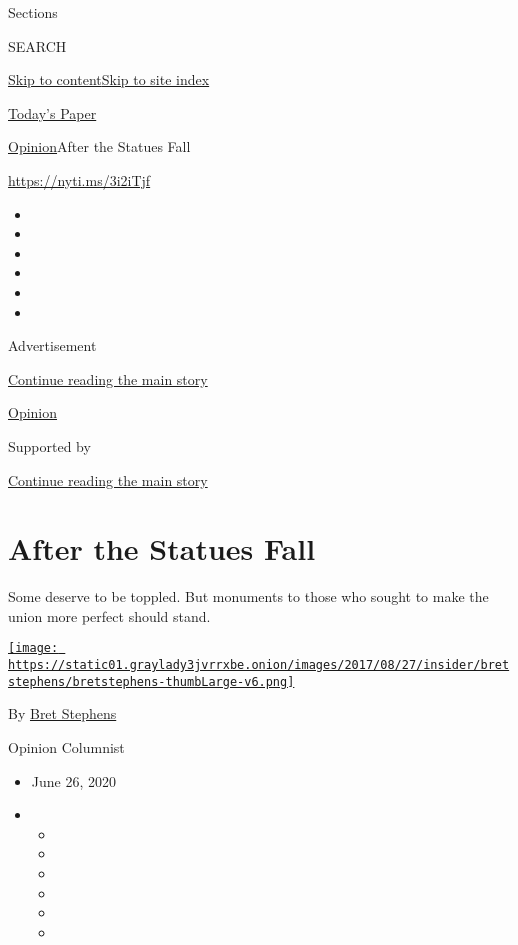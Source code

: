 Sections

SEARCH

\protect\hyperlink{site-content}{Skip to
content}\protect\hyperlink{site-index}{Skip to site index}

\href{https://myaccount.nytimes3xbfgragh.onion/auth/login?response_type=cookie\&client_id=vi}{}

\href{https://www.nytimes3xbfgragh.onion/section/todayspaper}{Today's
Paper}

\href{/section/opinion}{Opinion}\textbar{}After the Statues Fall

\url{https://nyti.ms/3i2iTjf}

\begin{itemize}
\item
\item
\item
\item
\item
\item
\end{itemize}

Advertisement

\protect\hyperlink{after-top}{Continue reading the main story}

\href{/section/opinion}{Opinion}

Supported by

\protect\hyperlink{after-sponsor}{Continue reading the main story}

\hypertarget{after-the-statues-fall}{%
\section{After the Statues Fall}\label{after-the-statues-fall}}

Some deserve to be toppled. But monuments to those who sought to make
the union more perfect should stand.

\href{https://www.nytimes3xbfgragh.onion/by/bret-stephens}{\texttt{[image: https://static01.graylady3jvrrxbe.onion/images/2017/08/27/insider/bretstephens/bretstephens-thumbLarge-v6.png]}}

By \href{https://www.nytimes3xbfgragh.onion/by/bret-stephens}{Bret
Stephens}

Opinion Columnist

\begin{itemize}
\item
  June 26, 2020
\item
  \begin{itemize}
  \item
  \item
  \item
  \item
  \item
  \item
  \end{itemize}
\end{itemize}

